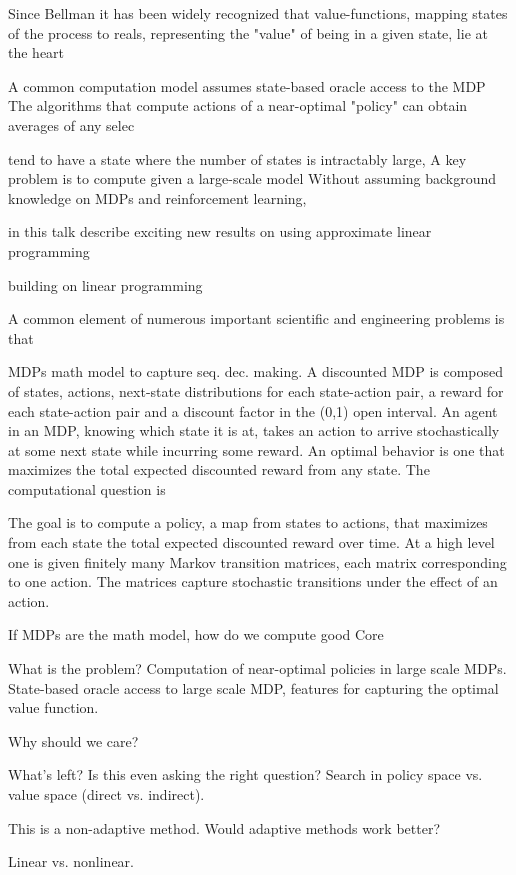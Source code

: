 Since Bellman it has been widely recognized that value-functions, mapping states of the process to reals, representing
the "value" of being in a given state, lie at the heart 

A common computation model assumes state-based oracle access to the MDP
The algorithms that compute actions of a near-optimal "policy" can obtain averages of any selec

tend to have a state  where the number of states is intractably large,
A key problem is to compute given a large-scale model
Without assuming background knowledge on MDPs and reinforcement learning,

in this talk 
describe exciting new results on using approximate linear programming


building on linear programming

A common element of numerous important scientific and engineering problems is that

MDPs math model to capture seq. dec. making.
A discounted MDP is composed of states, actions, next-state distributions for each state-action pair, a reward
for each state-action pair and a discount factor in the (0,1) open interval.
An agent in an MDP, knowing which state it is at,
takes an action to arrive stochastically at some next state while incurring some reward.
An optimal behavior is one that maximizes the total expected discounted reward from any state.
The computational question is 

The goal is to compute a policy, a map from states to actions, that maximizes from each state the total
expected discounted reward over time.
At a high level one is given finitely many Markov transition matrices, each matrix corresponding to one action.
The matrices capture stochastic transitions under the effect of an action.

If MDPs are the math model, how do we compute good
Core 

What is the problem?
Computation of near-optimal policies in large scale MDPs.
State-based oracle access to large scale MDP, features for capturing the optimal value function.

Why should we care?

What's left?
Is this even asking the right question? Search in policy space vs. value space (direct vs. indirect).

This is a non-adaptive method.
Would adaptive methods work better?

Linear vs. nonlinear.


